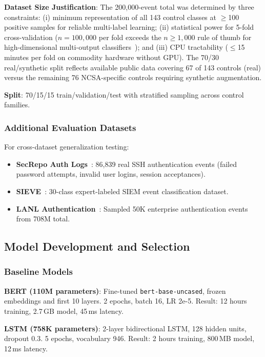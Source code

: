 \documentclass[futureinternet,article,submit,pdftex,moreauthors]{Definitions/mdpi}
\begin{document}
\textbf{Dataset Size Justification}: The 200{,}000-event total was determined by three
constraints: (i) minimum representation of all 143 control classes at $\geq$100 positive
samples for reliable multi-label learning; (ii) statistical power for 5-fold cross-validation
($n = 100{,}000$ per fold exceeds the $n \geq 1{,}000$ rule of thumb for high-dimensional
multi-output classifiers~\cite{tsoumakas2007}); and (iii) CPU tractability ($\leq$15 minutes
per fold on commodity hardware without GPU). The 70/30 real/synthetic split reflects available
public data covering 67 of 143 controls (real) versus the remaining 76 NCSA-specific controls
requiring synthetic augmentation.

\textbf{Split}: 70/15/15 train/validation/test with stratified sampling across control
families.

\subsubsection{Additional Evaluation Datasets}

For cross-dataset generalization testing:
\begin{itemize}
\item \textbf{SecRepo Auth Logs}~\cite{secrepo}: 86{,}839 real SSH authentication events
(failed password attempts, invalid user logins, session acceptances).
\item \textbf{SIEVE}~\cite{sieve_dataset}: 30-class expert-labeled SIEM event classification
dataset.
\item \textbf{LANL Authentication}~\cite{lanl_auth}: Sampled 50K enterprise authentication
events from 708M total.
\end{itemize}

\subsection{Model Development and Selection}

\subsubsection{Baseline Models}

\textbf{BERT (110M parameters)}: Fine-tuned \texttt{bert-base-uncased}, frozen embeddings
and first 10 layers. 2 epochs, batch 16, LR 2e-5. Result: 12 hours training, 2.7\,GB model,
45\,ms latency.

\textbf{LSTM (758K parameters)}: 2-layer bidirectional LSTM, 128 hidden units, dropout 0.3.
5 epochs, vocabulary 946. Result: 2 hours training, 800\,MB model, 12\,ms latency.
\end{document}
